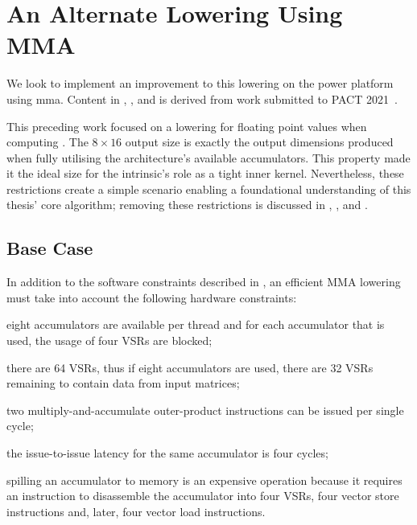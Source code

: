 \documentclass[\main/thesis.tex]{subfiles}
\begin{document}
\section{An Alternate Lowering Using MMA}
We look to implement an improvement to this lowering on the \gls{power} platform using \gls{mma}.
Content in , , and  is derived from work submitted to PACT 2021~\autocite{kuzma2021fast}.

This preceding work focused on a lowering for floating point values when computing .
The $8 \times 16$ output size is exactly the output dimensions produced when fully utilising the architecture's available accumulators.
This property made it the ideal size for the intrinsic's role as a tight inner kernel.
Nevertheless, these restrictions create a simple scenario enabling a foundational understanding of this thesis' core algorithm; removing these restrictions is discussed in , , and .

\subsection{Base Case}
\label{sec:baseCase}
In addition to the software constraints described in , an efficient MMA lowering must take into account the following hardware constraints:
\begin{enumerate*}[itemjoin*={{ and }}, label=\fbox{\arabic*}]
  \item eight accumulators are available per thread and for each accumulator that is used, the usage of four VSRs are blocked;
  \item there are 64 VSRs, thus if eight accumulators are used, there are 32 VSRs remaining to contain data from input matrices;
  \item two multiply-and-accumulate outer-product instructions can be issued per single cycle;
  \item the issue-to-issue latency for the same accumulator is four cycles;
  \item spilling an accumulator to memory is an expensive operation because it requires an instruction to disassemble the accumulator into four VSRs, four vector store instructions and, later, four vector load instructions.
\end{enumerate*}
\end{document}
